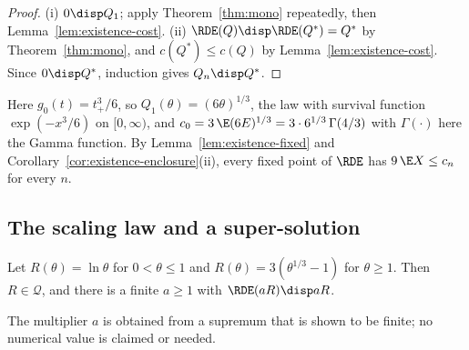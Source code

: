 \begin{proof}
(i) $0\disp Q_1$; apply Theorem~\ref{thm:mono} repeatedly, then
Lemma~\ref{lem:existence-cost}. (ii) $\RDE(Q)\disp\RDE(Q^*)=Q^*$ by Theorem~\ref{thm:mono}, and
$c(Q^*)\le c(Q)$ by Lemma~\ref{lem:existence-cost}. Since $0\disp Q^*$, induction gives
$Q_n\disp Q^*$.
\end{proof}

Here $g_{0}(t)=t_+^3/6$, so $Q_1(\theta)=(6\theta)^{1/3}$, the law with survival function
$\exp(-x^3/6)$ on $[0,\infty)$, and $c_0=3\,\E(6E)^{1/3}=3\cdot6^{1/3}\,\Gamma(4/3)$ with
$\Gamma(\cdot)$ here the Gamma function. By Lemma~\ref{lem:existence-fixed} and
Corollary~\ref{cor:existence-enclosure}(ii), every fixed point of $\RDE$ has
$9\,\E X\le c_n$ for every $n$.

\subsection{The scaling law and a super-solution}\label{subsec:existence-super}

\begin{lemma}\label{lem:existence-super}
Let $R(\theta)=\ln\theta$ for $0<\theta\le1$ and $R(\theta)=3(\theta^{1/3}-1)$ for
$\theta\ge1$. Then $R\in\mathcal{Q}$, and there is a finite $a\ge1$ with
$\RDE(aR)\disp aR$.
\end{lemma}

The multiplier $a$ is obtained from a supremum that is shown to be finite; no numerical value
is claimed or needed.

